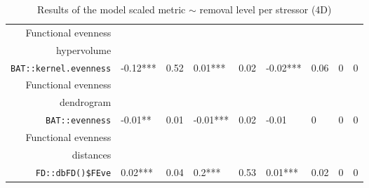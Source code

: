 \begin{table}[ht]
\begin{tabular}{rllllllll}
  Functional evenness\\ hypervolume\\ \texttt{BAT::kernel.evenness} & -0.12*** & 0.52 & 0.01*** & 0.02 & -0.02*** & 0.06 & 0 & 0 \\ 
  Functional evenness\\ dendrogram\\ \texttt{BAT::evenness} & -0.01** & 0.01 & -0.01*** & 0.02 & -0.01 & 0 & 0 & 0 \\ 
  Functional evenness\\ distances\\ \texttt{FD::dbFD()\$FEve} & 0.02*** & 0.04 & 0.2*** & 0.53 & 0.01*** & 0.02 & 0 & 0 \\ 
   \hline
\end{tabular}
\caption{Results of the model scaled metric $\sim$ removal level per stressor (4D)} 
\end{table}
